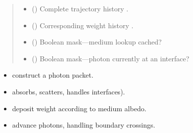 \documentclass[letterpaper,10pt,english]{sphinxmanual}
\begin{document}
\begin{fulllineitems}
\begin{quote}
\begin{description}
\begin{itemize}
\item {} 
\sphinxAtStartPar
{} () \textendash{} Complete trajectory history .

\item {} 
\sphinxAtStartPar
{} () \textendash{} Corresponding weight history .

\item {} 
\sphinxAtStartPar
{} () \textendash{} Boolean mask—medium lookup cached?

\item {} 
\sphinxAtStartPar
{} () \textendash{} Boolean mask—photon currently at an interface?

\end{itemize}

\end{description}\end{quote}

\sphinxAtStartPar
{}
\begin{itemize}
\item {} 
\sphinxAtStartPar
{} \textendash{} construct a photon packet.

\item {} \begin{description}
\sphinxAtStartPar
absorbs, scatters, handles interfaces).

\end{description}

\item {} 
\sphinxAtStartPar
{\hyperref[\detokenize{generated/photon_canon.optics:photon_canon.optics.Photon.absorb}]{}} \textendash{} deposit weight according to medium albedo.

\item {} 
\sphinxAtStartPar
{\hyperref[\detokenize{generated/photon_canon.optics:photon_canon.optics.Photon.move}]{}} \textendash{} advance photons, handling boundary crossings.


\end{itemize}
\end{fulllineitems}
\end{document}
